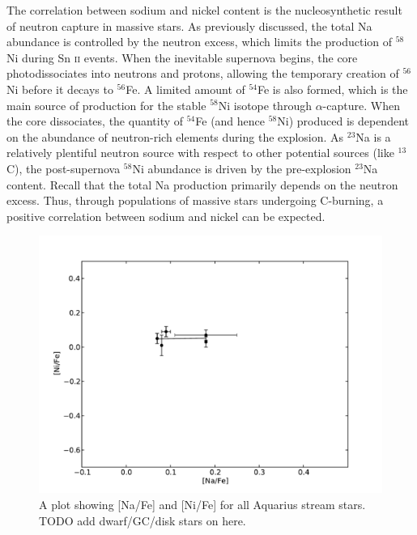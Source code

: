\documentclass{emulateapj}
\begin{document}
The correlation between sodium and nickel content is the nucleosynthetic result of neutron capture in massive stars. As previously discussed, the total Na abundance is controlled by the neutron excess, which limits the production of $^{58}$Ni during Sn \textsc{ii} events. When the inevitable supernova begins, the core photodissociates into neutrons and protons, allowing the temporary creation of $^{56}$Ni before it decays to $^{56}$Fe. A limited amount of $^{54}$Fe is also formed, which is the main source of production for the stable $^{58}$Ni isotope through $\alpha$-capture. When the core dissociates, the quantity of $^{54}$Fe (and hence $^{58}$Ni) produced is dependent on the abundance of neutron-rich elements during the explosion. As $^{23}$Na is a relatively plentiful neutron source with respect to other potential sources (like $^{13}$C), the post-supernova $^{58}$Ni abundance is driven by the pre-explosion $^{23}$Na content. Recall that the total Na production primarily depends on the neutron excess. Thus, through populations of massive stars undergoing C-burning, a positive correlation between sodium and nickel can be expected. 


\begin{figure}[h]
	\includegraphics[width=\columnwidth]{./figures/aquarius-na-ni.pdf}
	\caption{A plot showing [Na/Fe] and [Ni/Fe] for all Aquarius stream stars. TODO add dwarf/GC/disk stars on here.}
	\label{fig:na-ni}
\end{figure}
\end{document}
